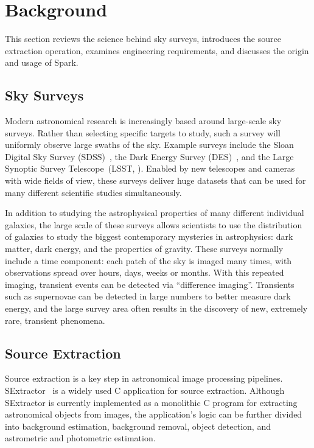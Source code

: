 \documentclass[10pt,journal,compsoc]{IEEEtran}
\begin{document}
\section{Background}
\label{sec:Background}

This section reviews the science behind sky surveys, introduces the source extraction operation, examines engineering requirements, and discusses the origin and usage of Spark.

\subsection{Sky Surveys}

Modern astronomical research is increasingly based around large-scale sky surveys.
Rather than selecting specific targets to study, such a survey will uniformly observe large
swaths of the sky. Example surveys include the Sloan Digital Sky Survey (SDSS)~\cite{york00},
the Dark Energy Survey (DES)~\cite{dark05}, and the Large Synoptic Survey Telescope~(LSST,
\cite{ivezic08}). Enabled by new telescopes and cameras with wide fields of view, these
surveys deliver huge datasets that can be used for many different scientific studies
simultaneously.

In addition to studying the astrophysical properties of many different individual galaxies,
the large scale of these surveys allows scientists to use the distribution of galaxies to
study the biggest contemporary mysteries in astrophysics: dark matter, dark energy, and 
the properties of gravity. These surveys normally include a time component: each patch of the sky is imaged many times,
with observations spread over hours, days, weeks or months. With this repeated imaging,
transient events can be detected via ``difference imaging''. Transients such as supernovae
can be detected in large numbers to better measure dark energy, and the large survey area
often results in the discovery of new, extremely rare, transient phenomena.

\subsection{Source Extraction}
\label{sec:Background-SE}
Source extraction is a key step in astronomical image processing pipelines.
SExtractor~\cite{bertin96} is a widely used C application for source extraction.
Although SExtractor is currently implemented as a monolithic C program for extracting astronomical
objects from images, the application's logic can be further divided into 
background estimation, background removal, object detection, and astrometric 
and photometric estimation.
\end{document}
